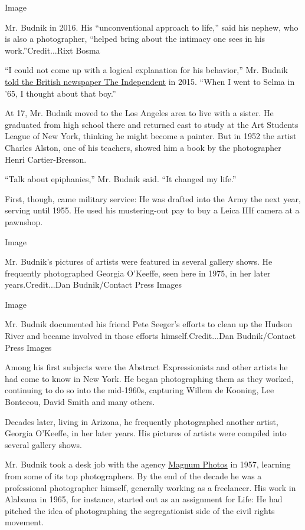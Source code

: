 Image

Mr. Budnik in 2016. His ``unconventional approach to life,'' said his
nephew, who is also a photographer, ``helped bring about the intimacy
one sees in his work.''Credit...Rixt Bosma

``I could not come up with a logical explanation for his behavior,'' Mr.
Budnik
\href{https://www.independent.co.uk/news/world/americas/on-the-road-to-civil-rights-extraordinary-images-of-the-selma-march-seen-for-the-first-time-10057218.html}{told
the British newspaper The Independent} in 2015. ``When I went to Selma
in '65, I thought about that boy.''

At 17, Mr. Budnik moved to the Los Angeles area to live with a sister.
He graduated from high school there and returned east to study at the
Art Students League of New York, thinking he might become a painter. But
in 1952 the artist Charles Alston, one of his teachers, showed him a
book by the photographer Henri Cartier-Bresson.

``Talk about epiphanies,'' Mr. Budnik said. ``It changed my life.''

First, though, came military service: He was drafted into the Army the
next year, serving until 1955. He used his mustering-out pay to buy a
Leica IIIf camera at a pawnshop.

Image

Mr. Budnik's pictures of artists were featured in several gallery shows.
He frequently photographed Georgia O'Keeffe, seen here in 1975, in her
later years.Credit...Dan Budnik/Contact Press Images

Image

Mr. Budnik documented his friend Pete Seeger's efforts to clean up the
Hudson River and became involved in those efforts himself.Credit...Dan
Budnik/Contact Press Images

Among his first subjects were the Abstract Expressionists and other
artists he had come to know in New York. He began photographing them as
they worked, continuing to do so into the mid-1960s, capturing Willem de
Kooning, Lee Bontecou, David Smith and many others.

Decades later, living in Arizona, he frequently photographed another
artist, Georgia O'Keeffe, in her later years. His pictures of artists
were compiled into several gallery shows.

Mr. Budnik took a desk job with the agency
\href{https://www.magnumphotos.com/}{Magnum Photos} in 1957, learning
from some of its top photographers. By the end of the decade he was a
professional photographer himself, generally working as a freelancer.
His work in Alabama in 1965, for instance, started out as an assignment
for Life: He had pitched the idea of photographing the segregationist
side of the civil rights movement.

